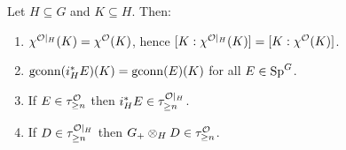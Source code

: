 \begin{qfivelemma}\label{lem:restr}
Let $H\subseteq G$ and $K\subseteq H$. Then:
\begin{enumerate}\setlength\itemsep{2pt}
\item $\chi^{\mathcal{O}|_H}(K)=\chi^{\mathcal{O}}(K)$, hence $[K:\chi^{\mathcal{O}|_H}(K)]=[K:\chi^{\mathcal{O}}(K)]$.
\item $\operatorname{gconn}(i_H^\ast E)(K)=\operatorname{gconn}(E)(K)$ for all $E\in\mathrm{Sp}^G$.
\item If $E\in\tau^{\mathcal{O}}_{\ge n}$ then $i_H^\ast E\in\tau^{\mathcal{O}|_H}_{\ge n}$.
\item If $D\in\tau^{\mathcal{O}|_H}_{\ge n}$ then $G_+\otimes_H D\in\tau^{\mathcal{O}}_{\ge n}$.
\end{enumerate}
\end{qfivelemma}

